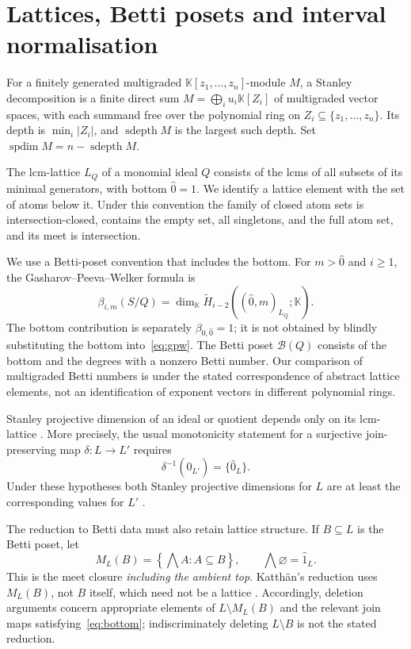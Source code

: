 \documentclass[11pt,a4paper]{article}
\theoremstyle{remark}\newtheorem{remark}[theorem]{Remark}
\DeclareMathOperator{\sdepth}{sdepth}
\DeclareMathOperator{\spdim}{spdim}
\newcommand{\B}{\mathcal B}
\newcommand{\K}{\mathbb K}
\begin{document}
\section{Lattices, Betti posets and interval normalisation}\label{sec:prelim}
For a finitely generated multigraded $\K[z_1,\ldots,z_n]$-module $M$, a Stanley decomposition is a finite direct sum $M=\bigoplus_i u_i\K[Z_i]$ of multigraded vector spaces, with each summand free over the polynomial ring on $Z_i\subseteq\{z_1,\ldots,z_n\}$. Its depth is $\min_i|Z_i|$, and $\sdepth M$ is the largest such depth. Set $\spdim M=n-\sdepth M$.

The lcm-lattice $L_Q$ of a monomial ideal $Q$ consists of the lcms of all subsets of its minimal generators, with bottom $\hat0=1$. We identify a lattice element with the set of atoms below it. Under this convention the family of closed atom sets is intersection-closed, contains the empty set, all singletons, and the full atom set, and its meet is intersection.

We use a Betti-poset convention that includes the bottom. For $m>\hat0$ and $i\ge1$, the Gasharov--Peeva--Welker formula \cite{GPW} is
\begin{equation}\label{eq:gpw}
\beta_{i,m}(S/Q)=\dim_{\K}\widetilde H_{i-2}((\hat0,m)_{L_Q};\K).
\end{equation}
The bottom contribution is separately $\beta_{0,\hat0}=1$; it is not obtained by blindly substituting the bottom into~\eqref{eq:gpw}. The Betti poset $\B(Q)$ consists of the bottom and the degrees with a nonzero Betti number. Our comparison of multigraded Betti numbers is under the stated correspondence of abstract lattice elements, not an identification of exponent vectors in different polynomial rings.

Stanley projective dimension of an ideal or quotient depends only on its lcm-lattice \cite{IKMF2017}. More precisely, the usual monotonicity statement for a surjective join-preserving map $\delta:L\to L'$ requires
\begin{equation}\label{eq:bottom}
\delta^{-1}(\hat0_{L'})=\{\hat0_L\}.
\end{equation}
Under these hypotheses both Stanley projective dimensions for $L$ are at least the corresponding values for $L'$ \cite[Theorem 4.5]{IKMF2017}.

The reduction to Betti data must also retain lattice structure. If $B\subseteq L$ is the Betti poset, let
\[
M_L(B)=\left\{\bigwedge A:A\subseteq B\right\},\qquad \bigwedge\varnothing=\hat1_L.
\]
This is the meet closure \emph{including the ambient top}. Katth\"an's reduction uses $M_L(B)$, not $B$ itself, which need not be a lattice \cite[Proposition 3.6]{Katthan2016}. Accordingly, deletion arguments concern appropriate elements of $L\setminus M_L(B)$ and the relevant join maps satisfying~\eqref{eq:bottom}; indiscriminately deleting $L\setminus B$ is not the stated reduction.
\end{document}
